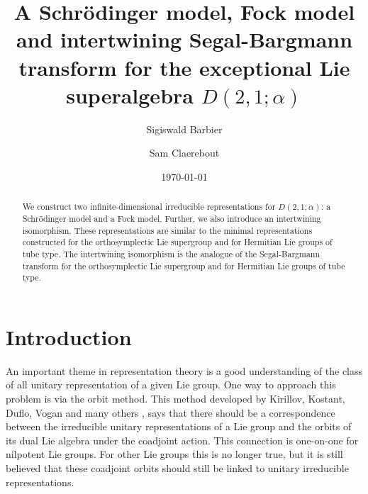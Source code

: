 \documentclass{amsart}
\numberwithin{theorem}{section}
\theoremstyle{definition}
\theoremstyle{remark}
\begin{document}
\title[Schr\"odinger model, Fock model and intertwiner for $D(2,1;\alpha)$]{A Schr\"odinger model, Fock model and intertwining Segal-Bargmann transform for the exceptional Lie superalgebra $D(2,1;\alpha)$}

\author{Sigiswald Barbier}
\address{Department of Electronics and Information Systems \\Faculty of Engineering and Architecture\\Ghent University\\Krijgslaan 281, 9000 Gent\\ Belgium.}

\author{Sam Claerebout}
\address{Department of Electronics and Information Systems \\Faculty of Engineering and Architecture\\Ghent University\\Krijgslaan 281, 9000 Gent\\ Belgium.}

\date{\today}

\begin{abstract}
We construct two infinite-dimensional irreducible representations for $D(2,1;\alpha)$: a Schrödinger model and a Fock model. Further, we also introduce an intertwining isomorphism. These representations are similar to the minimal representations constructed for the orthosymplectic Lie supergroup and for Hermitian Lie groups of tube type.    The intertwining isomorphism is the analogue of the Segal-Bargmann transform for the orthosymplectic Lie supergroup and for Hermitian Lie groups of tube type.    
\end{abstract}

\maketitle

\tableofcontents

\section{Introduction}
An important theme in representation theory is a good understanding of the class of all unitary representation of a given Lie group. One way to approach this problem is via the orbit method. This method developed by Kirillov, Kostant, Duflo, Vogan and many others \cite{Kirillov}, says that there should be a correspondence between the irreducible unitary representations of a Lie group and the orbits of its dual Lie algebra under the coadjoint action. This connection is one-on-one for nilpotent Lie groups. For other Lie groups this is no longer true, but it is still believed that these coadjoint orbits should still be linked to unitary irreducible representations. 
\end{document}
